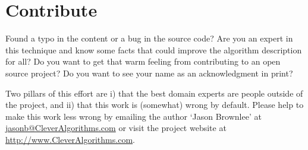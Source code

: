 \documentclass[a4paper, 11pt]{article}
\makeatletter
\newcommand{\myreportauthor}{Jason Brownlee}
\newcommand{\myreportemail}{jasonb@CleverAlgorithms.com}
\newcommand{\myreportwebsite}{http://www.CleverAlgorithms.com}
\makeatother
\begin{document}
% 
% 
\section{Contribute}
\label{sec:contribute}
Found a typo in the content or a bug in the source code? 
Are you an expert in this technique and know some facts that could improve the algorithm description for all?
Do you want to get that warm feeling from contributing to an open source project? 
Do you want to see your name as an acknowledgment in print?

Two pillars of this effort are i) that the best domain experts are people outside of the project, and ii) that this work is (somewhat) wrong by default. 
Please help to make this work less wrong by emailing the author `\myreportauthor' at \url{\myreportemail} or visit the project website at \url{\myreportwebsite}.



\end{document}
